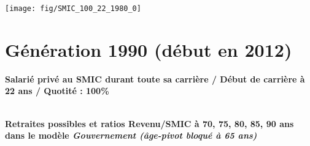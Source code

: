  \vspace{0.1cm} 

 {\hspace{-2.2cm}\texttt{[image: fig/SMIC\_100\_22\_1980\_0]}} 

\newpage 
 
\section{Génération 1990 (début en 2012)\label{SMIC_100_22_1990_0}} 
 
{\bf \noindent Salarié privé au SMIC durant toute sa carrière / Début de carrière à 22 ans / Quotité : 100\%}  ~ 

 ~\\{\bf \noindent Retraites possibles et ratios Revenu/SMIC à 70, 75, 80, 85, 90 ans dans le modèle \emph{Gouvernement (âge-pivot bloqué à 65 ans)}}  
 
